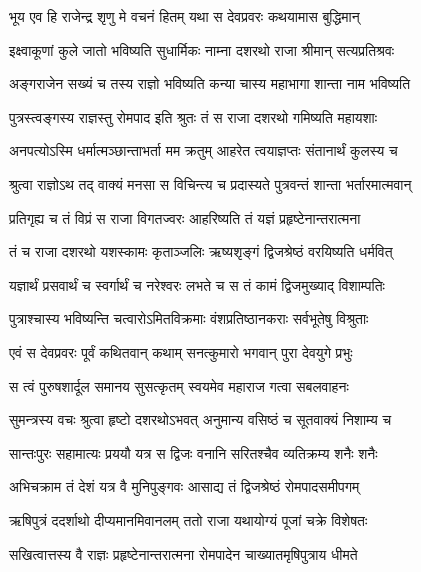 
\twolineshloka
{भूय एव हि राजेन्द्र शृणु मे वचनं हितम्}
{यथा स देवप्रवरः कथयामास बुद्धिमान्} %

\twolineshloka
{इक्ष्वाकूणां कुले जातो भविष्यति सुधार्मिकः}
{नाम्ना दशरथो राजा श्रीमान् सत्यप्रतिश्रवः} %

\twolineshloka
{अङ्गराजेन सख्यं च तस्य राज्ञो भविष्यति}
{कन्या चास्य महाभागा शान्ता नाम भविष्यति} %

\twolineshloka
{पुत्रस्त्वङ्गस्य राज्ञस्तु रोमपाद इति श्रुतः}
{तं स राजा दशरथो गमिष्यति महायशाः} %

\twolineshloka
{अनपत्योऽस्मि धर्मात्मञ्छान्ताभर्ता मम क्रतुम्}
{आहरेत त्वयाज्ञप्तः संतानार्थं कुलस्य च} %

\twolineshloka
{श्रुत्वा राज्ञोऽथ तद् वाक्यं मनसा स विचिन्त्य च}
{प्रदास्यते पुत्रवन्तं शान्ता भर्तारमात्मवान्} %

\twolineshloka
{प्रतिगृह्य च तं विप्रं स राजा विगतज्वरः}
{आहरिष्यति तं यज्ञं प्रहृष्टेनान्तरात्मना} %

\twolineshloka
{तं च राजा दशरथो यशस्कामः कृताञ्जलिः}
{ऋष्यशृङ्गं द्विजश्रेष्ठं वरयिष्यति धर्मवित्} %

\twolineshloka
{यज्ञार्थं प्रसवार्थं च स्वर्गार्थं च नरेश्वरः}
{लभते च स तं कामं द्विजमुख्याद् विशाम्पतिः} %

\twolineshloka
{पुत्राश्चास्य भविष्यन्ति चत्वारोऽमितविक्रमाः}
{वंशप्रतिष्ठानकराः सर्वभूतेषु विश्रुताः} %

\twolineshloka
{एवं स देवप्रवरः पूर्वं कथितवान् कथाम्}
{सनत्कुमारो भगवान् पुरा देवयुगे प्रभुः} %

\twolineshloka
{स त्वं पुरुषशार्दूल समानय सुसत्कृतम्}
{स्वयमेव महाराज गत्वा सबलवाहनः} %

\twolineshloka
{सुमन्त्रस्य वचः श्रुत्वा हृष्टो दशरथोऽभवत्}
{अनुमान्य वसिष्ठं च सूतवाक्यं निशाम्य च} %

\twolineshloka
{सान्तःपुरः सहामात्यः प्रययौ यत्र स द्विजः}
{वनानि सरितश्चैव व्यतिक्रम्य शनैः शनैः} %

\twolineshloka
{अभिचक्राम तं देशं यत्र वै मुनिपुङ्गवः}
{आसाद्य तं द्विजश्रेष्ठं रोमपादसमीपगम्} %

\twolineshloka
{ऋषिपुत्रं ददर्शाथो दीप्यमानमिवानलम्}
{ततो राजा यथायोग्यं पूजां चक्रे विशेषतः} %

\twolineshloka
{सखित्वात्तस्य वै राज्ञः प्रहृष्टेनान्तरात्मना}
{रोमपादेन चाख्यातमृषिपुत्राय धीमते} %

